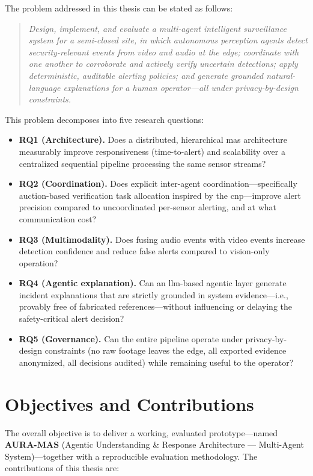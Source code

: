 The problem addressed in this thesis can be stated as follows:

\begin{quote}
\emph{Design, implement, and evaluate a multi-agent intelligent surveillance system for a semi-closed site, in which autonomous perception agents detect security-relevant events from video and audio at the edge; coordinate with one another to corroborate and actively verify uncertain detections; apply deterministic, auditable alerting policies; and generate grounded natural-language explanations for a human operator---all under privacy-by-design constraints.}
\end{quote}

This problem decomposes into five research questions:

\begin{itemize}
    \item \textbf{RQ1 (Architecture).} Does a distributed, hierarchical \gls{mas} architecture measurably improve responsiveness (time-to-alert) and scalability over a centralized sequential pipeline processing the same sensor streams?
    \item \textbf{RQ2 (Coordination).} Does explicit inter-agent coordination---specifically auction-based verification task allocation inspired by the \gls{cnp}---improve alert precision compared to uncoordinated per-sensor alerting, and at what communication cost?
    \item \textbf{RQ3 (Multimodality).} Does fusing audio events with video events increase detection confidence and reduce false alerts compared to vision-only operation?
    \item \textbf{RQ4 (Agentic explanation).} Can an \gls{llm}-based agentic layer generate incident explanations that are strictly grounded in system evidence---i.e., provably free of fabricated references---without influencing or delaying the safety-critical alert decision?
    \item \textbf{RQ5 (Governance).} Can the entire pipeline operate under privacy-by-design constraints (no raw footage leaves the edge, all exported evidence anonymized, all decisions audited) while remaining useful to the operator?
\end{itemize}

\section{Objectives and Contributions}

The overall objective is to deliver a working, evaluated prototype---named \textbf{AURA-MAS} (Agentic Understanding \& Response Architecture --- Multi-Agent System)---together with a reproducible evaluation methodology. The contributions of this thesis are:

